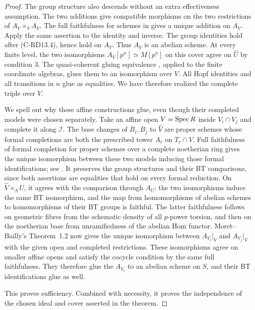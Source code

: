 \begin{proof}
The group structure also descends without an extra effectiveness
assumption. The two additions give compatible morphisms on the two
restrictions of $A_V\times_VA_V$. The full faithfulness for schemes
in \cite[Theorem~1.2, p.565]{MoretBailly1996Descent} gives a unique
addition on $A_V$. Apply the same assertion to the identity and
inverse. The group identities hold after (C-RD13.4), hence hold on
$A_V$. Thus $A_V$ is an abelian scheme. At every finite level, the
two isomorphisms $A_V[p^n]\simeq M[p^n]$ on this cover agree on
$\widehat U$ by condition 3. The quasi-coherent gluing equivalence
\cite[Theorem~0.3, p.561]{MoretBailly1996Descent}, applied to the
finite coordinate algebras, glues them to an isomorphism over $V$.
All Hopf identities and all transitions in $n$ glue as equalities.
We have therefore realized the complete triple over $V$.

We spell out why these affine constructions glue, even though their
completed models were chosen separately. Take an affine open
$V=\operatorname{Spec} R$ inside $V_i\cap V_j$ and complete it along $\mathcal I$.
The base changes of $B_i,B_j$ to $\widehat V$ are proper schemes
whose formal completions are both the prescribed tower $A_r$ on
$T_r\cap V$. Full faithfulness of formal completion for proper
schemes over a complete noetherian ring gives the unique
isomorphism between these two models inducing those formal
identifications; see \cite[Theorem~5.4.1, pp.156--157]{EGAIII1}.
It preserves the group structures and their BT comparisons, since
both assertions are equalities that hold on every formal reduction.
On $\widehat V\times_SU$, it agrees with the comparison through
$A_U$: the two isomorphisms induce the same BT isomorphism, and the
map from homomorphisms of abelian schemes to homomorphisms of their
BT groups is faithful. The latter faithfulness follows on geometric
fibres from the schematic density of all $p$-power torsion, and
then on the noetherian base from unramifiedness of the abelian Hom
functor. Moret--Bailly's Theorem~1.2 now gives the unique
isomorphism between $A_{V_i}|_V$ and $A_{V_j}|_V$ with the given
open and completed restrictions. These isomorphisms agree on
smaller affine opens and satisfy the cocycle condition by the same
full faithfulness. They therefore glue the $A_{V_i}$ to an abelian
scheme on $S$, and their BT identifications glue as well.

This proves sufficiency. Combined with necessity, it proves the
independence of the chosen ideal and cover asserted in the theorem.
\end{proof}

